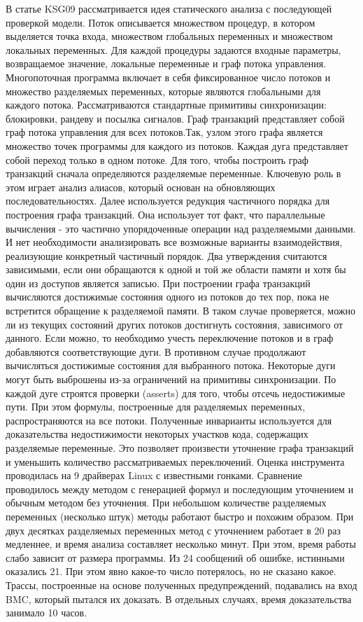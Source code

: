 В статье KSG09 рассматривается идея статического анализа с последующей проверкой модели.
Поток описывается множеством процедур, в котором выделяется точка входа, множеством глобальных переменных и множеством локальных переменных. Для каждой процедуры задаются входные параметры, возвращаемое значение, локальные переменные и граф потока управления. Многопоточная программа включает в себя фиксированное число потоков и множество разделяемых переменных, которые являются глобальными для каждого потока. Рассматриваются стандартные примитивы синхронизации: блокировки, рандеву и посылка сигналов. 
Граф транзакций представляет собой граф потока управления для всех потоков.Так, узлом этого графа является множество точек программы для каждого из потоков. Каждая дуга представляет собой переход только в одном потоке. Для того, чтобы построить граф транзакций сначала определяются разделяемые переменные. Ключевую роль в этом играет анализ алиасов, который основан на обновляющих последовательностях. Далее используется редукция частичного порядка для построения графа транзакций. Она использует тот факт, что параллельные вычисления - это частично упорядоченные операции над разделяемыми данными. И нет необходимости анализировать все возможные варианты взаимодействия, реализующие конкретный частичный порядок. Два утверждения считаются зависимыми, если они обращаются к одной и той же области памяти и хотя бы один из доступов является записью. При построении графа транзакций вычисляются достижимые состояния одного из потоков до тех пор, пока не встретится обращение к разделяемой памяти. В таком случае проверяется, можно ли из текущих состояний других потоков достигнуть состояния, зависимого от данного. Если можно, то необходимо учесть переключение потоков и в граф добавляются соответствующие дуги. В противном случае продолжают вычисляться достижимые состояния для выбранного потока. Некоторые дуги могут быть выброшены из-за ограничений на примитивы синхронизации. 
По каждой дуге строятся проверки (asserts) для того, чтобы отсечь недостижимые пути. При этом формулы, построенные для разделяемых переменных, распространяются на все потоки. Полученные инварианты используется для доказательства недостижимости некоторых участков кода, содержащих разделяемые переменные. Это позволяет произвести уточнение графа транзакций и уменьшить количество рассматриваемых переключений. 
Оценка инструмента проводилась на 9 драйверах Linux с известными гонками. Сравнение проводилось между методом с генерацией формул и последующим уточнением и обычным методом без уточнения. При небольшом количестве разделяемых переменных (несколько штук) методы работают быстро и похожим образом. При двух десятках разделяемых переменных метод с уточнением работает в 20 раз медленнее, и время анализа составляет несколько минут. При этом, время работы слабо зависит от размера программы. Из 24 сообщений об ошибке, истинными оказались 21. При этом явно какое-то число потерялось, но не сказано какое. Трассы, построенные на основе полученных предупреждений, подавались на вход BMC, который пытался их доказать. В отдельных случаях, время доказательства занимало 10 часов. 

